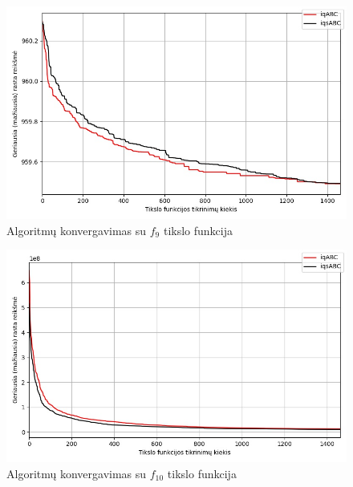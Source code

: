 \documentclass{VUMIFPSmagistrinis}
\begin{document}
\begin{landscape}
\begin{multicols}{2}
\begin{figure}[H]
    \centering
    \includegraphics[scale=0.5]{img/2kg/f9.jpg}
    \caption{Algoritmų konvergavimas su $f_{9}$ tikslo funkcija}
    \label{img:vkonf9}
\end{figure}


\begin{figure}[H]
    \centering
    \includegraphics[scale=0.5]{img/2kg/f10.jpg}
    \caption{Algoritmų konvergavimas su $f_{10}$ tikslo funkcija}
    \label{img:vkonf10}
\end{figure}




\end{multicols}\newpage
\begin{multicols}{2}



\end{multicols}
\end{landscape}
\end{document}
